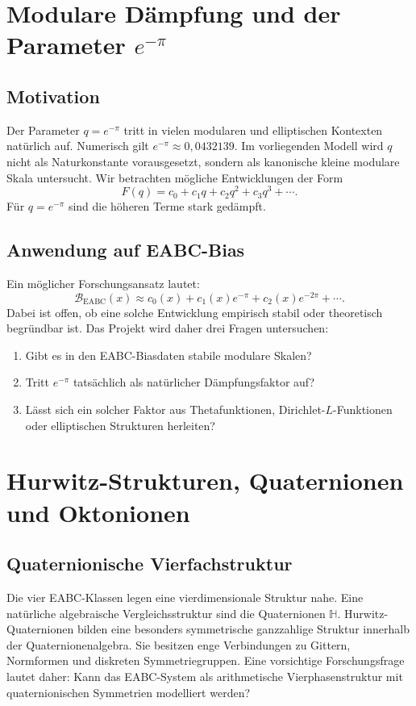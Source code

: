 \documentclass[11pt,a4paper,bibliography=totoc]{scrartcl}
\begin{document}
\section{Modulare Dämpfung und der Parameter \texorpdfstring{$e^{-\pi}$}{e\textasciicircum(-\textbackslash pi)}}

\subsection{Motivation}
Der Parameter $q = e^{-\pi}$ tritt in vielen modularen und elliptischen Kontexten natürlich auf. Numerisch gilt $e^{-\pi} \approx 0{,}0432139$. Im vorliegenden Modell wird $q$ nicht als Naturkonstante vorausgesetzt, sondern als kanonische kleine modulare Skala untersucht. Wir betrachten mögliche Entwicklungen der Form
\[
F(q) = c_0 + c_1 q + c_2 q^2 + c_3 q^3 + \cdots.
\]
Für $q = e^{-\pi}$ sind die höheren Terme stark gedämpft.

\subsection{Anwendung auf EABC-Bias}
Ein möglicher Forschungsansatz lautet:
\[
\mathcal{B}_{\mathrm{EABC}}(x) \approx c_0(x) + c_1(x)e^{-\pi} + c_2(x)e^{-2\pi} + \cdots.
\]
Dabei ist offen, ob eine solche Entwicklung empirisch stabil oder theoretisch begründbar ist. Das Projekt wird daher drei Fragen untersuchen:
\begin{enumerate}
    \item Gibt es in den EABC-Biasdaten stabile modulare Skalen?
    \item Tritt $e^{-\pi}$ tatsächlich als natürlicher Dämpfungsfaktor auf?
    \item Lässt sich ein solcher Faktor aus Thetafunktionen, Dirichlet-$L$-Funktionen oder elliptischen Strukturen herleiten?
\end{enumerate}

\section{Hurwitz-Strukturen, Quaternionen und Oktonionen}

\subsection{Quaternionische Vierfachstruktur}
Die vier EABC-Klassen legen eine vierdimensionale Struktur nahe. Eine natürliche algebraische Vergleichsstruktur sind die Quaternionen $\mathbb{H}$. Hurwitz-Quaternionen bilden eine besonders symmetrische ganzzahlige Struktur innerhalb der Quaternionenalgebra. Sie besitzen enge Verbindungen zu Gittern, Normformen und diskreten Symmetriegruppen. Eine vorsichtige Forschungsfrage lautet daher: Kann das EABC-System als arithmetische Vierphasenstruktur mit quaternionischen Symmetrien modelliert werden?
\end{document}
